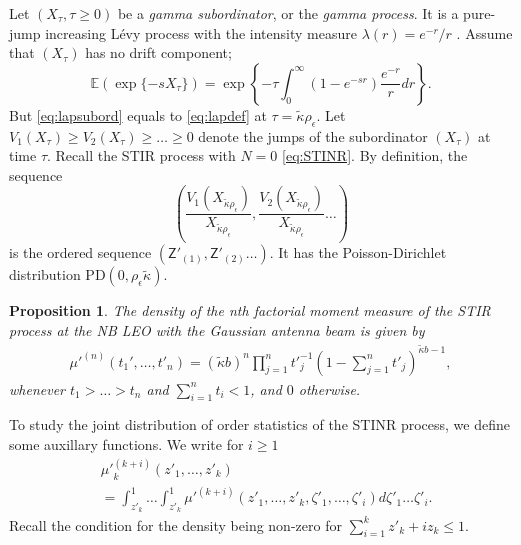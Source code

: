 \documentclass[lettersize,journal]{IEEEtran}
\newtheorem{prop}[theorem]{Proposition}
\begin{document}
Let $(X_{\tau}, \tau\geq 0)$ be a \textit{gamma subordinator}, or the \textit{gamma process}. It is a pure-jump increasing Lévy process with the intensity measure $\lambda(r) = e^{- r}/r$ . Assume that $(X_{\tau})$ has no drift component;
\begin{equation}
  \label{eq:lapsubord}
  \mathbb{E}(\exp\{-s X_{\tau}\}) = \exp\left\{-{\tau} \int_0^{\infty}(1-e^{-s r})\frac{e^{-r}}{r} dr \right\}.
\end{equation}
But \eqref{eq:lapsubord} equals to \eqref{eq:lapdef} at $\tau=\tilde{\kappa}\rho_{\epsilon} $. Let $V_1(X_{\tau}) \geq V_2(X_{\tau})\geq \dots \geq 0 $ denote the jumps of the subordinator $(X_{\tau})$ at time $\tau$. Recall the STIR process with $N=0$ \eqref{eq:STINR}. By definition, the sequence
\begin{equation}
  \label{eq:relativesequence}
  \left(\frac{V_1(X_{\tilde{\kappa}\rho_{\epsilon}})}{X_{\tilde{\kappa}\rho_{\epsilon}}},\frac{V_2(X_{\tilde{\kappa}\rho_{\epsilon}})}{X_{\tilde{\kappa}\rho_{\epsilon}}} \dots \right)
\end{equation}
is the ordered sequence $(\mathsf{Z}'_{(1)},\mathsf{Z}'_{(2)} \dots)$. It has the Poisson-Dirichlet distribution PD$(0, \rho_{\epsilon} \tilde{\kappa})$. 




\begin{prop}
  The density of the n\textit{th} factorial moment measure of the STIR process at the NB LEO with the Gaussian antenna beam is given by
  \begin{align}
    \label{eq:factorialmoment}
    \mu'^{(n)}(t_1',\dots,t'_n) = (\tilde{\kappa}b)^n\prod_{j=1}^n{t'}_{j}^{-1}\left(1- \sum_{j=1}^nt'_j \right)^{\tilde{\kappa}b-1},       
  \end{align}
  whenever $t_1>\dots >t_n$ and $\sum_{i=1}^n t_i <1$, and $0$ otherwise.
\end{prop}
To study the joint distribution of order statistics of the STINR process, we define some auxillary functions. We write for $i\geq 1$
\begin{align}
  \label{eq:auxillary}
  &{\mu'}_k^{(k+i)}(z'_1,\dots,z'_k) \nonumber \\
  &= \int_{z'_k}^1 \dots \int_{z'_k}^1 {\mu'}^{(k+i)}(z'_1,\dots,z'_k,\zeta'_1,\dots,\zeta'_i) d\zeta'_1 \dots \zeta'_i.
\end{align}
Recall the condition for the density being non-zero for $\sum_{i=1}^kz'_k+iz_k \leq 1 $.
\end{document}

